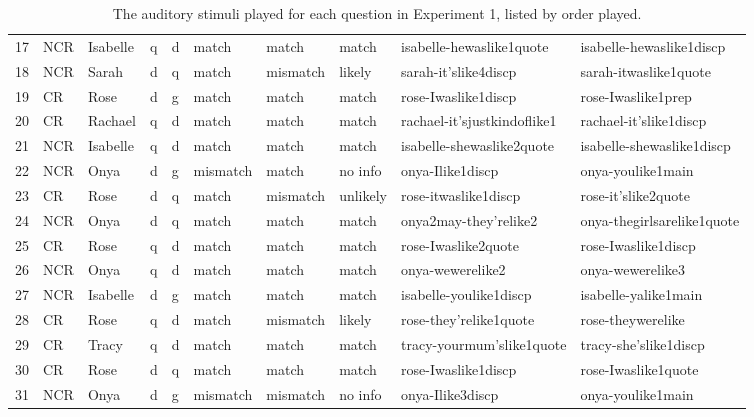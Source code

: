 \begin{sidewaystable}[htbp]
\begin{center}
{\begin{tabular}{llllllllll}
17 & NCR & Isabelle & q & d & match & match & match & isabelle-hewaslike1quote & isabelle-hewaslike1discp \\
18 & NCR & Sarah & d & q & match & mismatch & likely & sarah-it'slike4discp	& sarah-itwaslike1quote \\
19 & CR	& Rose	& d & g & match &	match &	match &	rose-Iwaslike1discp & rose-Iwaslike1prep \\
20 & CR & Rachael & q & d & match &	match &	match &	rachael-it'sjustkindoflike1	& rachael-it'slike1discp \\
21 & NCR & Isabelle & q & d & match	& match	& match	& isabelle-shewaslike2quote	& isabelle-shewaslike1discp \\
22 & NCR & Onya & d & g &	mismatch & match & no info & onya-Ilike1discp	& onya-youlike1main  \\
23 & CR	& Rose	& d & q &	match &	mismatch & unlikely &	rose-itwaslike1discp &	rose-it'slike2quote \\
24 & NCR & Onya &	d &	q &	match &	match &	match	& onya2may-they'relike2	& onya-thegirlsarelike1quote \\
25 & CR	& Rose &	q &	d & match &	match &	match &	rose-Iwaslike2quote &	rose-Iwaslike1discp \\
26 & NCR & Onya &	q	& d &	match	& match	& match	& onya-wewerelike2 & onya-wewerelike3 \\
27 & NCR & Isabelle &	d &	g &	match	& match &	match &	isabelle-youlike1discp & isabelle-yalike1main \\
28 & CR &	Rose &	q &	d & match &	mismatch & likely &	rose-they'relike1quote	& rose-theywerelike \\
29 & CR & Tracy &	q	& d & match &	match &	match &	tracy-yourmum'slike1quote &	tracy-she'slike1discp \\
30 & CR &	Rose &	d &	q	& match	& match	& match	& rose-Iwaslike1discp & rose-Iwaslike1quote \\
31 & NCR & Onya	& d &	g	& mismatch & mismatch	& no info &	onya-Ilike3discp & onya-youlike1main \\
   \hline
   
\end{tabular}
}
\caption{The auditory stimuli played for each question in Experiment 1, listed by order played.}\label{tab:appenExp1stimuli}
\end{center}
\end{sidewaystable}	



